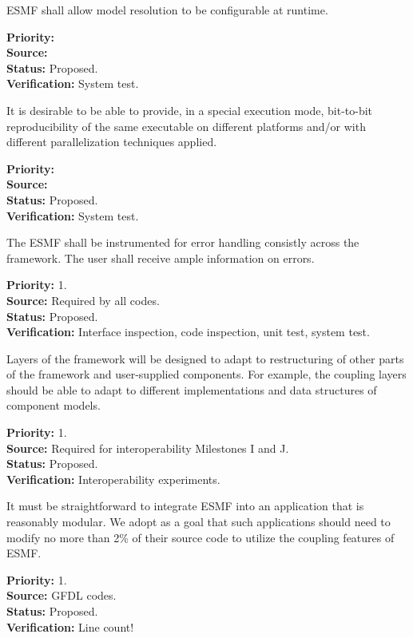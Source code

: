 ESMF shall allow model resolution to be configurable at runtime.
\begin{reqlist}
{\bf Priority:} \\
{\bf Source:} \\
{\bf Status:} Proposed. \\
{\bf Verification:} System test.
\end{reqlist}

It is desirable to be able to provide, in a special execution 
mode, bit-to-bit reproducibility of the same executable on different 
platforms and/or with different parallelization techniques applied.
\begin{reqlist}
{\bf Priority:} \\
{\bf Source:} \\
{\bf Status:} Proposed. \\
{\bf Verification:} System test.
\end{reqlist}

The ESMF shall be instrumented for error handling consistly across the
framework.  The user shall receive ample information on errors.
\begin{reqlist}
{\bf Priority:} 1. \\
{\bf Source:} Required by all codes. \\
{\bf Status:} Proposed. \\
{\bf Verification:} Interface inspection, code inspection, unit test, system test.
\end{reqlist}

Layers of the framework will be designed to adapt to
restructuring of other parts of the framework and user-supplied components.  
For example, the coupling layers should be able to adapt to different 
implementations and data structures of component models.
\begin{reqlist}
{\bf Priority:} 1. \\
{\bf Source:} Required for interoperability Milestones I and J. \\
{\bf Status:} Proposed. \\
{\bf Verification:} Interoperability experiments.
\end{reqlist}

It must be straightforward to integrate ESMF into an application 
that is reasonably modular.  We adopt as a goal that such applications should
need to modify no more than 2\% of their source code to utilize the coupling
features of ESMF.
\begin{reqlist}
{\bf Priority:} 1. \\
{\bf Source:} GFDL codes. \\
{\bf Status:} Proposed. \\
{\bf Verification:} Line count!
\end{reqlist}

